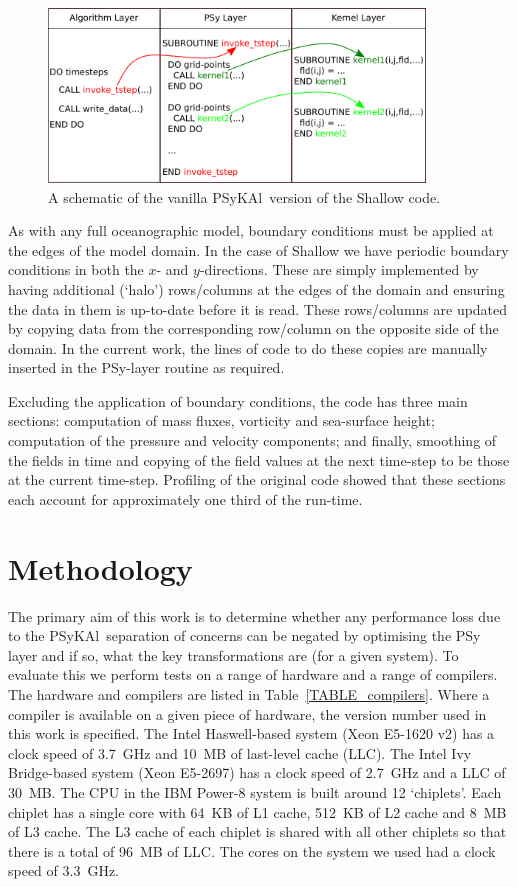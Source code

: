 \documentclass{IOS-Book-Article}
\newcommand{\psykal}{{PS}y{KA}l}
\begin{document}
\begin{figure}
\centering
\includegraphics[width=100mm]{psykal_shallow}
\caption{A schematic of the vanilla \psykal\ version of the Shallow code.}
\label{FIG_psykal_shallow_structure}
\end{figure}

As with any full oceanographic model, boundary conditions must be
applied at the edges of the model domain. In the case of Shallow we
have periodic boundary conditions in both the $x$- and $y$-directions.
These are simply implemented by having additional (`halo')
rows/columns at the edges of the domain and ensuring the data in them
is up-to-date before it is read. These rows/columns are updated by
copying data from the corresponding row/column on the opposite side of
the domain. In the current work, the lines of code to do these copies
are manually inserted in the PSy-layer routine as required.

Excluding the application of boundary conditions, the code has three
main sections: computation of mass fluxes, vorticity and sea-surface
height; computation of the pressure and velocity components; and
finally, smoothing of the fields in time and copying of the field
values at the next time-step to be those at the current
time-step. Profiling of the original code showed that these 
sections each account for approximately one third of the run-time.

\section{Methodology}

The primary aim of this work is to determine whether any performance
loss due to the \psykal\ separation of concerns can be negated by
optimising the PSy layer and if so, what the key transformations are
(for a given system). To evaluate this we perform tests on a range of
hardware and a range of compilers. The hardware and compilers are
listed in Table~\ref{TABLE_compilers}. Where a compiler is available
on a given piece of hardware, the version number used in this work is
specified.
%
The Intel Haswell-based system (Xeon E5-1620 v2) has a clock speed of
3.7~GHz and 10~MB of last-level cache (LLC). The Intel Ivy
Bridge-based system (Xeon E5-2697) has a clock speed of 2.7~GHz and a
LLC of 30~MB. The CPU in the IBM Power-8 system is built around 12
`chiplets'. Each chiplet has a single core with 64~KB of L1 cache,
512~KB of L2 cache and 8~MB of L3 cache. The L3 cache of each chiplet
is shared with all other chiplets so that there is a total of 96~MB of
LLC. The cores on the system we used had a clock speed of 3.3~GHz.
\end{document}
